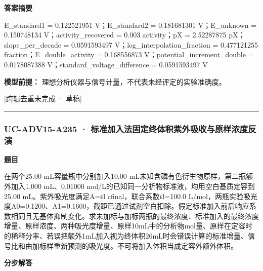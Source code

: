 \documentclass[UTF8,11pt,a4paper]{ctexart}
\begin{document}
\noindent\textbf{答案摘要}\par
E\_standard1 = 0.122521951 V；E\_standard2 = 0.181681301 V；E\_unknown = 0.150748134 V；activity\_recovered = 0.003 activity；pX = 2.52287875 pX；slope\_per\_decade = 0.0591593497 V；log\_interpolation\_fraction = 0.477121255 fraction；E\_double\_activity = 0.168556873 V；potential\_increment\_double = 0.0178087388 V；standard\_voltage\_difference = 0.0591593497 V\par
\noindent\textbf{模型前提：}
理想分析仪器与信号计量，不代表未经评定的实验准确度。\par
\noindent\textcolor{red!65!black}{[跨辑去重未完成 · 草稿]} \par
\medskip\hrule\medskip
{}
\subsubsection*{UC-ADV15-A235 · 标准加入法固定终体积紫外吸收与原样浓度反演}
\noindent\textbf{题目}\par
在两个25.00 mL容量瓶中分别加入10.00 mL未知含磷有色衍生物原样，第二瓶额外加入1.000 mL、0.01000 mol/L的已知同一分析物标准液，均用空白基质定容到25.00 mL。紫外吸光度满足A=εl cfinal，联合系数εl=100.0 L/mol，两瓶实验吸光度A0=0.1200、A1=0.1600，截距已通过试剂空白扣除。假定标准加入前后响应系数相同且无基体抑制变化。求未加标与加标两瓶的最终浓度、标准加入的最终浓度增量、原样浓度、两种吸光度增量、原样10mL中的分析物mol量、原样在定容时的稀释分率、若误把额外1mL加入视为终体积26mL时会错误计算的标准增量、信号比和由加标样重新预测的吸光度。不可将加入体积当成定容外额外体积。\par
\medskip\noindent\textbf{分步解答}
\end{document}
